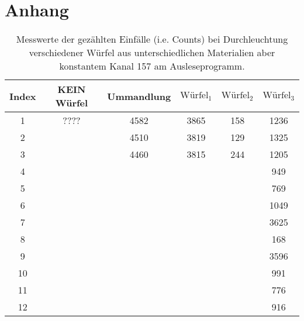 \newpage
\section{Anhang}
\begin{table}
    \centering
    \caption{Messwerte der gezählten Einfälle (i.e. Counts) bei Durchleuchtung verschiedener Würfel aus unterschiedlichen Materialien aber konstantem
            Kanal 157 am Ausleseprogramm.} 
    \label{tab:1}
    \begin{tabular}{c c c c c c}
    \toprule
    Index & KEIN Würfel & Ummandlung & $\text{Würfel}_1 $ &  $\text{Würfel}_2 $ & $\text{Würfel}_3$ \\
    \midrule
1    &  ????   &   4582  &  3865 &   158  &   1236  \\
2    &     &   4510  &  3819 &   129  &   1325  \\
3    &     &   4460  &  3815 &   244  &   1205  \\
4    &     &        &      &       &   949   \\   
5    &     &        &      &       &   769   \\
6    &     &        &      &       &   1049  \\
7    &     &        &      &       &   3625  \\
8    &     &        &      &       &   168   \\
9    &     &        &      &       &   3596  \\
10   &     &        &      &       &   991   \\
11   &     &        &      &       &   776   \\
12   &     &        &      &       &   916   \\
\end{tabular}
\end{table}